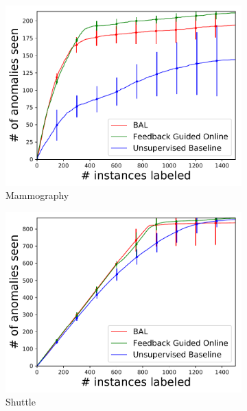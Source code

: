 \documentclass{article} %
\begin{document}
\begin{figure}[h]
	\begin{subfigure}[b]{0.23\textwidth}
		\includegraphics[width=\textwidth]{fbonline/num_seen-mammography.pdf}
		\caption{Mammography}
		\label{fig:angles_mammography}
	\end{subfigure}
	\begin{subfigure}[b]{0.23\textwidth}
		\includegraphics[width=\textwidth]{fbonline/num_seen-shuttle_1v23567.pdf}
		\caption{Shuttle}
		\label{fig:angles_shuttle}
	\end{subfigure}
	\begin{subfigure}[b]{0.23\textwidth}

\end{subfigure}
\end{figure}
\end{document}
